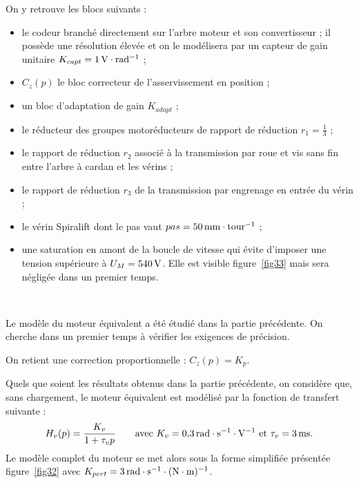 On y retrouve les blocs suivants :
\begin{itemize}
\item[---] le codeur branché directement sur l'arbre moteur et son convertisseur ; il possède une résolution élevée et on le modélisera par un capteur de gain unitaire $K_{capt}=1\,\mathrm{V\cdot rad^{-1}}$ ;
\item $C_z(p)$ le bloc correcteur de l'asservissement en position ;
\item un bloc d'adaptation de gain $K_{adapt}$ ;
\item le réducteur des groupes motoréducteurs de rapport de réduction $r_1=\frac13$ ;
\item le rapport de réduction $r_2$ associé à la transmission par roue et vis sans fin entre l'arbre à cardan et les vérins ;
\item le rapport de réduction $r_3$ de la transmission par engrenage en entrée du vérin ;
\item le vérin Spiralift dont le pas vaut $pas=50\,\mathrm{mm\cdot tour^{-1}}$ ;
\item une saturation en amont de la boucle de vitesse qui évite d'imposer une tension supérieure à $U_M=540\,\mathrm{V}$. Elle est visible figure~\ref{fig33} mais sera négligée dans un premier temps.
\end{itemize}


~\

Le modèle du moteur équivalent a été étudié dans la partie précédente. On cherche dans un premier temps à vérifier les exigences de précision.

On retient une correction proportionnelle : $C_z(p)=K_p$.

Quels que soient les résultats obtenus dans la partie précédente, on considère que, sans chargement, le moteur équivalent est modélisé par la fonction de transfert suivante :
\[
H_v(p)=\dfrac{K_v}{1+\tau_vp}\qquad\text{avec } K_v=0{,}3\,\mathrm{rad\cdot s^{-1}\cdot V^{-1}}\text{ et }\tau_v=3\,\mathrm{ms}.
\]
Le modèle complet du moteur se met alors sous la forme simplifiée présentée figure~\ref{fig32} avec $K_{pert}=3\,\mathrm{rad\cdot s^{-1}\cdot(N\cdot m)^{-1}}$.


